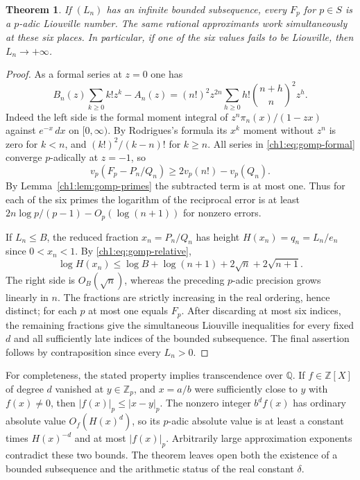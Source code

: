 \documentclass[11pt,a4paper,oneside,openany]{report}
\newtheorem{theorem}{Theorem}[section]
\theoremstyle{remark}\newtheorem{remark}[theorem]{Remark}
\numberwithin{equation}{section}
\begin{document}
\begin{theorem}\label{ch1:thm:gomp-padic}
If $(L_n)$ has an infinite bounded subsequence, every $F_p$ for
$p\in S$ is a $p$-adic Liouville number. The same rational approximants
work simultaneously at these six places. In particular, if one of
the six values fails to be Liouville, then $L_n\to+\infty$.
\end{theorem}
\begin{proof}
As a formal series at $z=0$ one has
\begin{equation}\label{ch1:eq:gomp-formal}
 B_n(z)\sum_{k\ge0}k!z^k-A_n(z)
 =(n!)^2z^{2n}\sum_{h\ge0} h!\binom{n+h}{n}^2 z^h.
\end{equation}
Indeed the left side is the formal moment integral of
$z^n\pi_n(x)/(1-zx)$ against $e^{-x}\,dx$ on $[0,\infty)$.
By Rodrigues's formula its $x^k$ moment without $z^n$ is zero for
$k<n$, and $(k!)^2/(k-n)!$ for $k\ge n$.
All series in \eqref{ch1:eq:gomp-formal} converge $p$-adically at $z=-1$,
so
\[
 v_p(F_p-P_n/Q_n)\ge 2v_p(n!)-v_p(Q_n).
\]
By Lemma~\ref{ch1:lem:gomp-primes} the subtracted term is at most one.
Thus for each of the six primes the logarithm of the reciprocal error
is at least $2n\log p/(p-1)-O_p(\log(n+1))$ for nonzero errors.

If $L_n\le B$, the reduced fraction $x_n=P_n/Q_n$ has height
$H(x_n)=q_n=L_n/e_n$ since $0<x_n<1$. By
\eqref{ch1:eq:gomp-relative},
\[
 \log H(x_n)\le \log B+\log(n+1)+2\sqrt n+2\sqrt{n+1}.
\]
The right side is $O_B(\sqrt n)$, whereas the preceding $p$-adic
precision grows linearly in $n$. The fractions are strictly increasing
in the real ordering, hence distinct; for each $p$ at most one equals
$F_p$. After discarding at most six indices, the remaining fractions
give the simultaneous Liouville inequalities for every fixed $d$ and
all sufficiently late indices of the bounded subsequence.
The final assertion follows by contraposition since every $L_n>0$.
\end{proof}

For completeness, the stated property implies transcendence over
$\mathbb Q$. If $f\in\mathbb Z[X]$ of degree $d$ vanished at
$y\in\mathbb Z_p$, and $x=a/b$ were sufficiently close to $y$ with
$f(x)\ne0$, then $|f(x)|_p\le |x-y|_p$. The nonzero integer
$b^df(x)$ has ordinary absolute value $O_f(H(x)^d)$, so its $p$-adic
absolute value is at least a constant times $H(x)^{-d}$ and at most
$|f(x)|_p$. Arbitrarily large approximation exponents contradict these
two bounds. The theorem leaves open both the existence of a bounded
subsequence and the arithmetic status of the real constant $\delta$.
\end{document}

